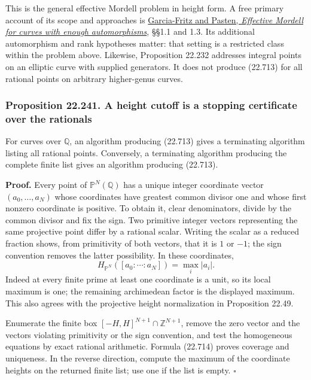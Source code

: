 \documentclass[
  11pt,
  a4paper,
]{article}
\begin{document}
This is the general effective Mordell problem in height form. A free
primary account of its scope and approaches is
\href{https://arxiv.org/pdf/2503.10443v2}{Garcia-Fritz and Pasten,
\emph{Effective Mordell for curves with enough automorphisms}}, §§1.1
and 1.3. Its additional automorphism and rank hypotheses matter: that
setting is a restricted class within the problem above. Likewise,
Proposition 22.232 addresses integral points on an elliptic curve with
supplied generators. It does not produce (22.713) for all rational
points on arbitrary higher-genus curves.

\subsubsection{Proposition 22.241. A height cutoff is a stopping
certificate over the
rationals}\label{proposition-22.241.-a-height-cutoff-is-a-stopping-certificate-over-the-rationals}

For curves over \(\mathbb Q\), an algorithm producing (22.713) gives a
terminating algorithm listing all rational points. Conversely, a
terminating algorithm producing the complete finite list gives an
algorithm producing (22.713).

\textbf{Proof.} Every point of \(\mathbb P^N(\mathbb Q)\) has a unique
integer coordinate vector \((a_0,\ldots,a_N)\) whose coordinates have
greatest common divisor one and whose first nonzero coordinate is
positive. To obtain it, clear denominators, divide by the common divisor
and fix the sign. Two primitive integer vectors representing the same
projective point differ by a rational scalar. Writing the scalar as a
reduced fraction shows, from primitivity of both vectors, that it is
\(1\) or \(-1\); the sign convention removes the latter possibility. In
these coordinates, \[
 H_{\mathbb P^N}([a_0:\cdots:a_N])=\max_i|a_i|.
 \tag{22.714}
\] Indeed at every finite prime at least one coordinate is a unit, so
its local maximum is one; the remaining archimedean factor is the
displayed maximum. This also agrees with the projective height
normalization in Proposition 22.49.

Enumerate the finite box \([-H,H]^{N+1}\cap\mathbb Z^{N+1}\), remove the
zero vector and the vectors violating primitivity or the sign
convention, and test the homogeneous equations by exact rational
arithmetic. Formula (22.714) proves coverage and uniqueness. In the
reverse direction, compute the maximum of the coordinate heights on the
returned finite list; use one if the list is empty. \(\square\)
\end{document}
